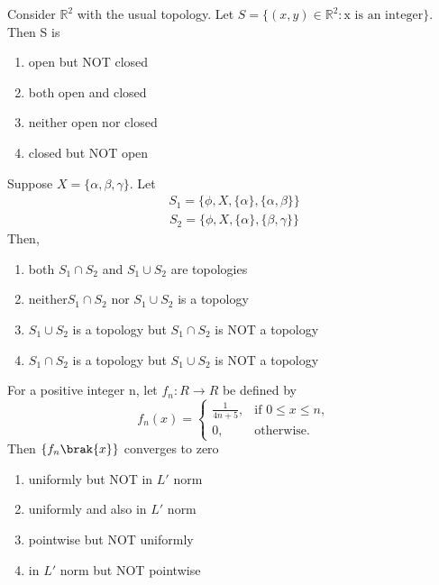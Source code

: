 \iffalse
\title{Assignment2}
\author{ee24btech110664}
\chapter{2007}
\section{ma}
\fi

\item Consider $\mathbb{R}^2$ with the usual topology. Let $S=\{(x,y)\in \mathbb{R}^2:\text{x is an integer}\}$. Then S is 
\begin{enumerate}
    \item open but NOT closed 
    \item  both open and closed
    \item  neither open nor closed
    \item  closed but NOT open
\end{enumerate}
\item Suppose $X=\{\alpha,\beta,\gamma\}$. Let
\begin{align*}
    S_1=\{\phi,X,\{\alpha\},\{\alpha,\beta\}\} 
\end{align*}
\begin{align*}
    S_2=\{\phi,X,\{\alpha\},\{\beta,\gamma\}\} 
\end{align*}
Then,
\begin{enumerate}
    \item both $S_1 \cap S_2$ and $S_1\cup S_2$ are topologies
    \item neither$S_1 \cap S_2$ nor $S_1\cup S_2$ is a topology
    \item $S_1\cup S_2$ is a topology but $S_1 \cap S_2$ is NOT a topology
    \item $S_1 \cap S_2$ is a topology but $S_1\cup S_2$ is NOT a topology
\end{enumerate}
\item For a positive integer n, let $f_n:R\rightarrow R$ be defined by
\[
f_n(x) = \begin{cases}
\frac{1}{4n+5}, & \text{if } 0 \leq x \leq n, \\
0, & \text{otherwise.}
\end{cases}
\]
Then $\{f_n\brak{x}\}$ converges to zero
\begin{enumerate}
       \item uniformly but NOT in $L'$ norm
       \item uniformly and also in $L'$ norm
       \item pointwise but NOT uniformly
       \item in $L'$ norm but NOT pointwise 
\end{enumerate}
